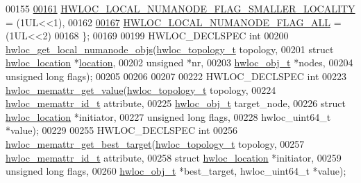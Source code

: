 \begin{DoxyCode}
00155 
\hyperlink{a00211_ggab9c963ca37255da71b00d94e1b106f9daac9c5e3a2cfb1b193e4acfceaf3bad57}{00161}   \hyperlink{a00211_ggab9c963ca37255da71b00d94e1b106f9daac9c5e3a2cfb1b193e4acfceaf3bad57}{HWLOC\_LOCAL\_NUMANODE\_FLAG\_SMALLER\_LOCALITY} = (1UL<<1),
00162 
\hyperlink{a00211_ggab9c963ca37255da71b00d94e1b106f9dab5778b34c961a5d56f98f1549edeaed0}{00167}   \hyperlink{a00211_ggab9c963ca37255da71b00d94e1b106f9dab5778b34c961a5d56f98f1549edeaed0}{HWLOC\_LOCAL\_NUMANODE\_FLAG\_ALL} = (1UL<<2)
00168 \};
00169 
00199 HWLOC\_DECLSPEC \textcolor{keywordtype}{int}
00200 \hyperlink{a00211_ga569e80c5be7ef27649b0ef5aa52ffcdc}{hwloc\_get\_local\_numanode\_objs}(\hyperlink{a00186_ga9d1e76ee15a7dee158b786c30b6a6e38}{hwloc\_topology\_t} topology,
00201                               \textcolor{keyword}{struct} \hyperlink{a00314}{hwloc\_location} *\hyperlink{a00314_a20cc864865c1133a833dabecff7626db}{location},
00202                               \textcolor{keywordtype}{unsigned} *nr,
00203                               \hyperlink{a00238}{hwloc\_obj\_t} *nodes,
00204                               \textcolor{keywordtype}{unsigned} \textcolor{keywordtype}{long} flags);
00205 
00206 
00207 
00222 HWLOC\_DECLSPEC \textcolor{keywordtype}{int}
00223 \hyperlink{a00211_ga297e4a9adc2272446a4c7449dacef0df}{hwloc\_memattr\_get\_value}(\hyperlink{a00186_ga9d1e76ee15a7dee158b786c30b6a6e38}{hwloc\_topology\_t} topology,
00224                         \hyperlink{a00211_gacc82003a8610be554615995f0996c888}{hwloc\_memattr\_id\_t} attribute,
00225                         \hyperlink{a00238}{hwloc\_obj\_t} target\_node,
00226                         \textcolor{keyword}{struct} \hyperlink{a00314}{hwloc\_location} *initiator,
00227                         \textcolor{keywordtype}{unsigned} \textcolor{keywordtype}{long} flags,
00228                         hwloc\_uint64\_t *value);
00229 
00255 HWLOC\_DECLSPEC \textcolor{keywordtype}{int}
00256 \hyperlink{a00211_ga884d1f2ad745c2fa69c1583c82d28f10}{hwloc\_memattr\_get\_best\_target}(\hyperlink{a00186_ga9d1e76ee15a7dee158b786c30b6a6e38}{hwloc\_topology\_t} topology,
00257                               \hyperlink{a00211_gacc82003a8610be554615995f0996c888}{hwloc\_memattr\_id\_t} attribute,
00258                               \textcolor{keyword}{struct} \hyperlink{a00314}{hwloc\_location} *initiator,
00259                               \textcolor{keywordtype}{unsigned} \textcolor{keywordtype}{long} flags,
00260                               \hyperlink{a00238}{hwloc\_obj\_t} *best\_target, hwloc\_uint64\_t *value);

\end{DoxyCode}
